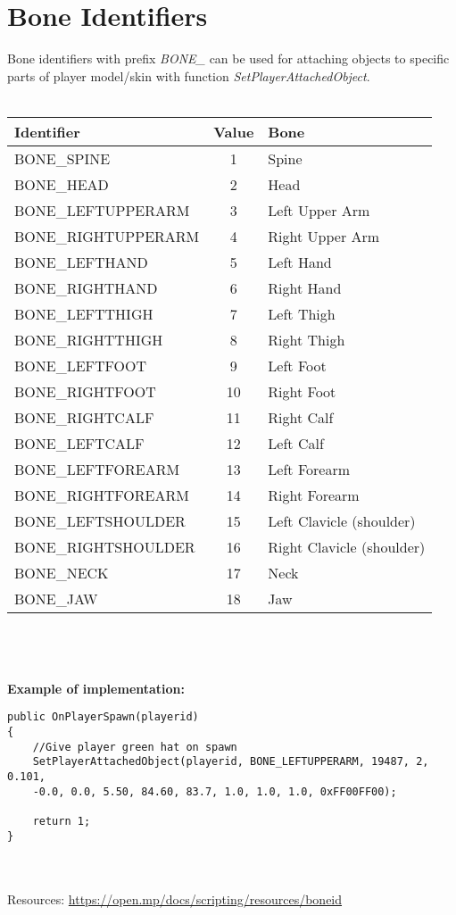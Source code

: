 \documentclass{article}
\begin{document}
\section{Bone Identifiers}
Bone identifiers with prefix \textit{BONE\_} can be used for attaching objects to specific parts of player model/skin with function \textit{SetPlayerAttachedObject}.
\\
\\
\begin{tabular}{ |l|c|l| } 
\hline
Identifier & Value & Bone \\
\hline
BONE\_SPINE & 1 & Spine \\
BONE\_HEAD & 2 & Head \\
BONE\_LEFTUPPERARM & 3 & Left Upper Arm \\
BONE\_RIGHTUPPERARM & 4 & Right Upper Arm \\
BONE\_LEFTHAND & 5 & Left Hand \\
BONE\_RIGHTHAND & 6 & Right Hand \\
BONE\_LEFTTHIGH & 7 & Left Thigh \\
BONE\_RIGHTTHIGH & 8 & Right Thigh \\
BONE\_LEFTFOOT & 9 & Left Foot \\
BONE\_RIGHTFOOT & 10 & Right Foot \\
BONE\_RIGHTCALF & 11 & Right Calf \\
BONE\_LEFTCALF & 12 & Left Calf \\
BONE\_LEFTFOREARM & 13 & Left Forearm \\
BONE\_RIGHTFOREARM & 14 & Right Forearm \\
BONE\_LEFTSHOULDER & 15 & Left Clavicle (shoulder) \\
BONE\_RIGHTSHOULDER & 16 & Right Clavicle (shoulder) \\
BONE\_NECK & 17 & Neck \\
BONE\_JAW & 18 & Jaw \\
\hline
\end{tabular}
\\
\\
\\\textbf{Example of implementation:}
\begin{verbatim}
public OnPlayerSpawn(playerid)
{
    //Give player green hat on spawn
    SetPlayerAttachedObject(playerid, BONE_LEFTUPPERARM, 19487, 2, 0.101, 
    -0.0, 0.0, 5.50, 84.60, 83.7, 1.0, 1.0, 1.0, 0xFF00FF00);

    return 1;
}
\end{verbatim}
\\
\\Resources: \url{https://open.mp/docs/scripting/resources/boneid}
\end{document}
